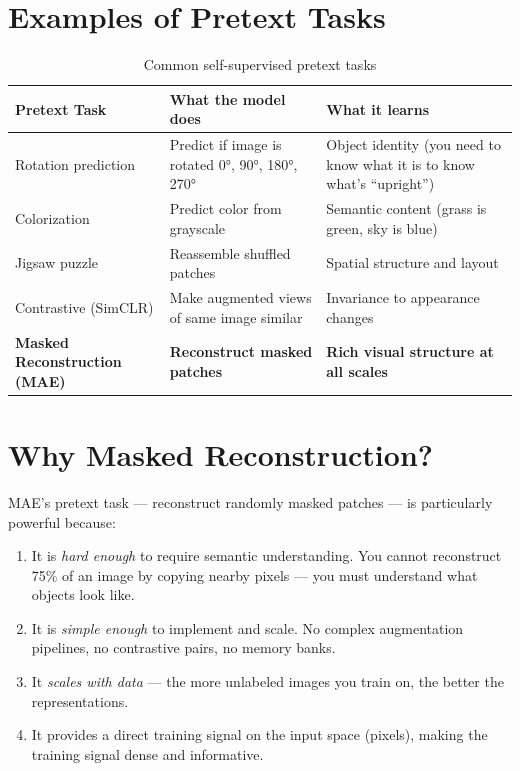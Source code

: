 \documentclass[12pt, a4paper]{report}
\begin{document}
\section{Examples of Pretext Tasks}

\begin{table}[H]
\centering
\begin{tabular}{p{3cm}p{5cm}p{5cm}}
\toprule
\textbf{Pretext Task} & \textbf{What the model does} & \textbf{What it learns} \\
\midrule
Rotation prediction & Predict if image is rotated 0°, 90°, 180°, 270° & Object identity (you need to know what it is to know what's ``upright'') \\
Colorization & Predict color from grayscale & Semantic content (grass is green, sky is blue) \\
Jigsaw puzzle & Reassemble shuffled patches & Spatial structure and layout \\
Contrastive (SimCLR) & Make augmented views of same image similar & Invariance to appearance changes \\
\textbf{Masked Reconstruction (MAE)} & \textbf{Reconstruct masked patches} & \textbf{Rich visual structure at all scales} \\
\bottomrule
\end{tabular}
\caption{Common self-supervised pretext tasks}
\end{table}

\section{Why Masked Reconstruction?}

MAE's pretext task — reconstruct randomly masked patches — is particularly powerful because:

\begin{enumerate}
    \item It is \emph{hard enough} to require semantic understanding. You cannot reconstruct 75\% of an image by copying nearby pixels — you must understand what objects look like.
    \item It is \emph{simple enough} to implement and scale. No complex augmentation pipelines, no contrastive pairs, no memory banks.
    \item It \emph{scales with data} — the more unlabeled images you train on, the better the representations.
    \item It provides a direct training signal on the input space (pixels), making the training signal dense and informative.
\end{enumerate}
\end{document}
